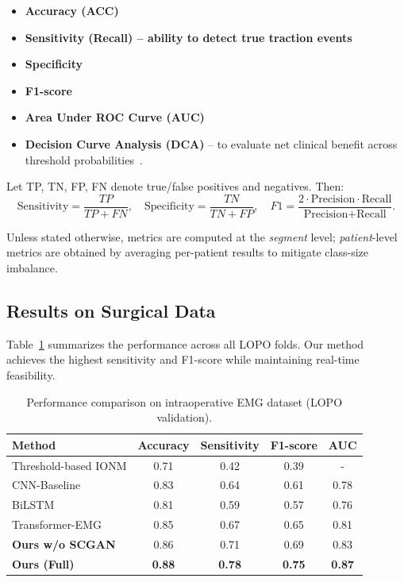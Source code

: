 \documentclass[10pt]{article}
\begin{document}
\begin{itemize}
    \item \textbf{Accuracy (ACC)}
    \item \textbf{Sensitivity (Recall) – ability to detect true traction events}
    \item \textbf{Specificity}
    \item \textbf{F1-score}
    \item \textbf{Area Under ROC Curve (AUC)}
    \item \textbf{Decision Curve Analysis (DCA)} – to evaluate net clinical benefit across threshold probabilities~\cite{DCA_Vickers2006}.
\end{itemize}

Let TP, TN, FP, FN denote true/false positives and negatives. Then:
\[
\text{Sensitivity} = \frac{TP}{TP + FN}, \quad
\text{Specificity} = \frac{TN}{TN + FP}, \quad
F1 = \frac{2 \cdot \text{Precision} \cdot \text{Recall}}{\text{Precision} + \text{Recall}}.
\]

Unless stated otherwise, metrics are computed at the \emph{segment} level; \emph{patient}-level metrics are obtained by averaging per-patient results to mitigate class-size imbalance.

\subsection{Results on Surgical Data}

Table~\ref{tab:main_results} summarizes the performance across all LOPO folds. 
Our method achieves the highest sensitivity and F1-score while maintaining real-time feasibility.

\begin{table}[h]
\centering
\caption{Performance comparison on intraoperative EMG dataset (LOPO validation).}
\label{tab:main_results}
\begin{tabular}{lcccc}
\toprule
\textbf{Method} & \textbf{Accuracy} & \textbf{Sensitivity} & \textbf{F1-score} & \textbf{AUC} \\
\midrule
Threshold-based IONM        & 0.71 & 0.42 & 0.39 & - \\
CNN-Baseline~\cite{RealTime_CNN_EMG_2019} & 0.83 & 0.64 & 0.61 & 0.78 \\
BiLSTM                      & 0.81 & 0.59 & 0.57 & 0.76 \\
Transformer-EMG            & 0.85 & 0.67 & 0.65 & 0.81 \\
\textbf{Ours w/o SCGAN}    & 0.86 & 0.71 & 0.69 & 0.83 \\
\textbf{Ours (Full)}       & \textbf{0.88} & \textbf{0.78} & \textbf{0.75} & \textbf{0.87} \\
\bottomrule
\end{tabular}
\end{table}
\end{document}

